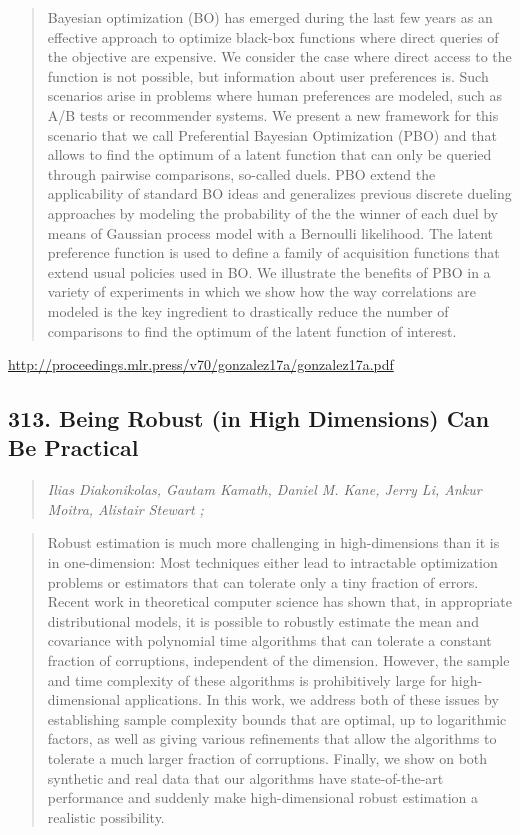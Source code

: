 \documentclass{article}
\begin{document}
\begin{quote}
    Bayesian optimization (BO) has emerged during the last few years as an effective approach to optimize black-box functions where direct queries of the objective are expensive. We consider the case where direct access to the function is not possible, but information about user preferences is. Such scenarios arise in problems where human preferences are modeled, such as A/B tests or recommender systems. We present a new framework for this scenario that we call Preferential Bayesian Optimization (PBO) and that allows to find the optimum of a latent function that can only be queried through pairwise comparisons, so-called duels. PBO extend the applicability of standard BO ideas and generalizes previous discrete dueling approaches by modeling the probability of the the winner of each duel by means of Gaussian process model with a Bernoulli likelihood. The latent preference function is used to define a family of acquisition functions that extend usual policies used in BO. We illustrate the benefits of PBO in a variety of experiments in which we show how the way correlations are modeled is the key ingredient to drastically reduce the number of comparisons to find the optimum of the latent function of interest.  
\end{quote}

\href{http://proceedings.mlr.press/v70/gonzalez17a/gonzalez17a.pdf}{http://proceedings.mlr.press/v70/gonzalez17a/gonzalez17a.pdf}

\subsection{313. Being Robust (in High Dimensions) Can Be Practical}

\begin{quote}
\footnotesize{\textit{Ilias Diakonikolas, Gautam Kamath, Daniel M. Kane, Jerry Li, Ankur Moitra, Alistair Stewart ;}}

\end{quote}

\begin{quote}
    Robust estimation is much more challenging in high-dimensions than it is in one-dimension: Most techniques either lead to intractable optimization problems or estimators that can tolerate only a tiny fraction of errors. Recent work in theoretical computer science has shown that, in appropriate distributional models, it is possible to robustly estimate the mean and covariance with polynomial time algorithms that can tolerate a constant fraction of corruptions, independent of the dimension. However, the sample and time complexity of these algorithms is prohibitively large for high-dimensional applications. In this work, we address both of these issues by establishing sample complexity bounds that are optimal, up to logarithmic factors, as well as giving various refinements that allow the algorithms to tolerate a much larger fraction of corruptions. Finally, we show on both synthetic and real data that our algorithms have state-of-the-art performance and suddenly make high-dimensional robust estimation a realistic possibility.  
\end{quote}
\end{document}
